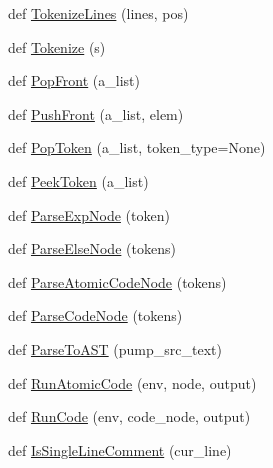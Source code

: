 \begin{DoxyCompactItemize}
\item 
def \mbox{\hyperlink{namespacegoogletest-master_1_1googletest_1_1scripts_1_1pump_a9d87707ea33dd6bcac434ed52e778132}{Tokenize\+Lines}} (lines, pos)
\item 
def \mbox{\hyperlink{namespacegoogletest-master_1_1googletest_1_1scripts_1_1pump_a52092664233b262eb52dc977f503b5a3}{Tokenize}} (s)
\item 
def \mbox{\hyperlink{namespacegoogletest-master_1_1googletest_1_1scripts_1_1pump_aca307ef2f4b7155e2ec3cefd5db02c3e}{Pop\+Front}} (a\+\_\+list)
\item 
def \mbox{\hyperlink{namespacegoogletest-master_1_1googletest_1_1scripts_1_1pump_ad0fa92f5983273a40cb8ef73991b4c06}{Push\+Front}} (a\+\_\+list, elem)
\item 
def \mbox{\hyperlink{namespacegoogletest-master_1_1googletest_1_1scripts_1_1pump_a3f8ca4527c0cff5b2bf305cfd1331647}{Pop\+Token}} (a\+\_\+list, token\+\_\+type=None)
\item 
def \mbox{\hyperlink{namespacegoogletest-master_1_1googletest_1_1scripts_1_1pump_ac6aa88b7d980ef8263dd22b2e318c795}{Peek\+Token}} (a\+\_\+list)
\item 
def \mbox{\hyperlink{namespacegoogletest-master_1_1googletest_1_1scripts_1_1pump_ab5a71a1e660fe55efe0d398d1aef0b43}{Parse\+Exp\+Node}} (token)
\item 
def \mbox{\hyperlink{namespacegoogletest-master_1_1googletest_1_1scripts_1_1pump_a301975d984ef0c7a3e64acc10c9aed2a}{Parse\+Else\+Node}} (tokens)
\item 
def \mbox{\hyperlink{namespacegoogletest-master_1_1googletest_1_1scripts_1_1pump_abeaaeb0495fd0f5039921b57835147a7}{Parse\+Atomic\+Code\+Node}} (tokens)
\item 
def \mbox{\hyperlink{namespacegoogletest-master_1_1googletest_1_1scripts_1_1pump_a6f1964221bb2379348d7fa1a61e00696}{Parse\+Code\+Node}} (tokens)
\item 
def \mbox{\hyperlink{namespacegoogletest-master_1_1googletest_1_1scripts_1_1pump_a41cfeb42e479045ccae88f1253dc7f09}{Parse\+To\+A\+ST}} (pump\+\_\+src\+\_\+text)
\item 
def \mbox{\hyperlink{namespacegoogletest-master_1_1googletest_1_1scripts_1_1pump_a067e8b85966c613af721fc46584fb1e7}{Run\+Atomic\+Code}} (env, node, output)
\item 
def \mbox{\hyperlink{namespacegoogletest-master_1_1googletest_1_1scripts_1_1pump_acbfecb79890de0da1f326208394ada4e}{Run\+Code}} (env, code\+\_\+node, output)
\item 
def \mbox{\hyperlink{namespacegoogletest-master_1_1googletest_1_1scripts_1_1pump_a6d0eaea654bec53453ed06d2ff230bae}{Is\+Single\+Line\+Comment}} (cur\+\_\+line)

\end{DoxyCompactItemize}
